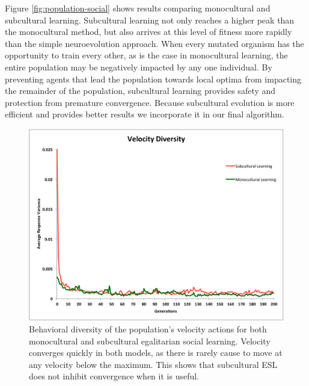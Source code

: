\documentclass{sig-alternate}
\begin{document}
Figure \ref{fig:population-social} shows results comparing monocultural and subcultural learning. Subcultural learning not only reaches a higher peak than the monocultural method, but also arrives at this level of fitness more rapidly than the simple neuroevolution approach. When every mutated organism has the opportunity to train every other, as is the case in monocultural learning, the entire population may be negatively impacted by any one individual. By preventing agents that lead the population towards local optima from impacting the remainder of the population, subcultural learning provides safety and protection from premature convergence.  Because subcultural evolution is more efficient and provides better results we incorporate it in our final algorithm.

\begin{figure}
  \centering
    \includegraphics[scale=.41]{velocity_diversity.pdf}
  \caption{Behavioral diversity of the population's velocity actions for both monocultural and subcultural egalitarian social learning.   Velocity converges quickly in both models, as there is rarely cause to move at any velocity below the maximum.  This shows that subcultural ESL does not inhibit convergence when it is useful.}
  \label{fig:velocity}
\end{figure}
\end{document}
